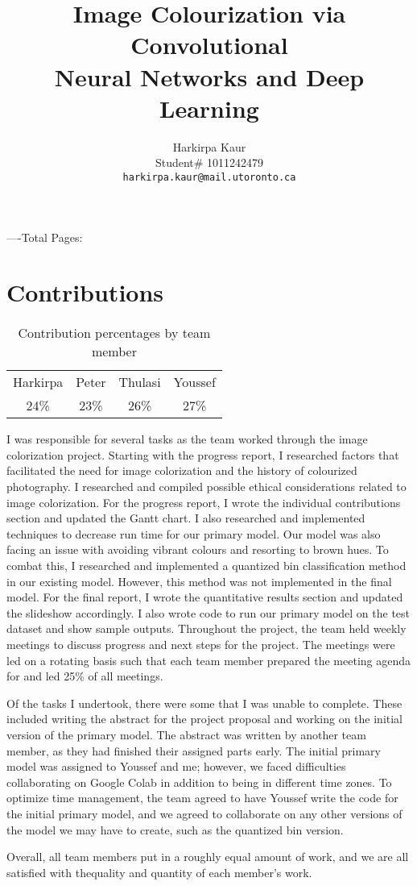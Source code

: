 \documentclass{article} %
\title{Image Colourization via Convolutional \\
Neural Networks and Deep Learning}
\author{Harkirpa Kaur  \\
Student\# 1011242479 \\
\texttt{harkirpa.kaur@mail.utoronto.ca}} \\
\begin{document}
\maketitle
----Total Pages: \pageref{last_page}

\section{Contributions}

\begin{table}[h]
\centering
\begin{tabular}{cccc}
\hline
Harkirpa & Peter & Thulasi & Youssef \\
24\% & 23\% & 26\% & 27\% \\
\hline
\end{tabular}
\caption{Contribution percentages by team member}
\label{tab:contributions}
\end{table}

I was responsible for several tasks as the team worked through the image colorization project. Starting with the progress report, I researched factors that facilitated the need for image colorization and
the history of colourized photography. I researched and compiled possible ethical considerations related to image colorization. For the progress report, I wrote the individual contributions section
and updated the Gantt chart. I also researched and implemented techniques to decrease run time for our primary model. Our model was also facing an issue with avoiding vibrant colours and resorting
to brown hues. To combat this, I researched and implemented a quantized bin classification method in our existing model. However, this method was not implemented in the final model. For the final
report, I wrote the quantitative results section and updated the slideshow accordingly. I also wrote code to run our primary model on the test dataset and show sample outputs.
Throughout the project, the team held weekly meetings to discuss progress and next steps for the project. The meetings were led on a rotating basis such that each team member prepared the meeting
agenda for and led 25\% of all meetings.

Of the tasks I undertook, there were some that I was unable to complete. These included writing the abstract for the project proposal and working on the initial version of the primary
model. The abstract was written by another team member, as they had finished their assigned parts early. The initial primary model was assigned to Youssef and me; however, we faced difficulties
collaborating on Google Colab in addition to being in different time zones. To optimize time management, the team agreed to have Youssef write the code for the initial primary model, and we agreed
to collaborate on any other versions of the model we may have to create, such as the quantized bin version.

Overall, all team members put in a roughly equal amount of work, and we are all satisfied with thequality and quantity of each member’s work.
\label{last_page}
\end{document}
